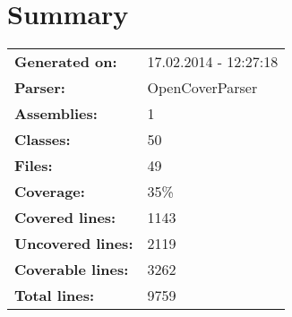 \documentclass[a4paper,10pt]{article}
\begin{document}
\setcounter{secnumdepth}{-1}
\section{Summary}
\begin{longtable}[l]{ll}
\textbf{Generated on:} & 17.02.2014 - 12:27:18\\
\textbf{Parser:} & OpenCoverParser\\
\textbf{Assemblies:} & 1\\
\textbf{Classes:} & 50\\
\textbf{Files:} & 49\\
\textbf{Coverage:} & 35\%\\
\textbf{Covered lines:} & 1143\\
\textbf{Uncovered lines:} & 2119\\
\textbf{Coverable lines:} & 3262\\
\textbf{Total lines:} & 9759\\
\end{longtable}
\end{document}
